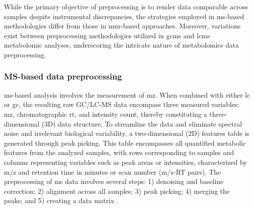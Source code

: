 \documentclass[ENG, BIB]{TFUOC}%
\begin{document}
While the primary objective of preprocessing is to render data comparable across samples despite instrumental discrepancies, the strategies employed in \gls{ms}-based methodologies differ from those in \gls{nmr}-based approaches. Moreover, variations exist between preprocessing methodologies utilized in \gls{gcms} and \gls{lcms} metabolomic analyses, underscoring the intricate nature of metabolomics data preprocessing.


\subsubsection{MS-based data preprocessing}

\gls{ms}-based analysis involves the measurement of \gls{mz}. When combined with either \gls{lc} or \gls{gc}, the resulting raw GC/LC-MS data encompass three measured variables: \gls{mz}, chromatographic \gls{rt}, and intensity count, thereby constituting a three-dimensional (3D) data structure.
To streamline the data and eliminate spectral noise and irrelevant biological variability, a two-dimensional (2D) features table is generated through peak picking. This table encompasses all quantified metabolic features from the analyzed samples, with rows corresponding to samples and columns representing variables such as peak areas or intensities, characterized by m/z and retention time in minutes or scan number (m/z-RT pairs).
The preprocessing of \gls{ms} data involves several steps: 1) denoising and baseline correction; 2) alignment across all samples; 3) peak picking; 4) merging the peaks; and 5) creating a data matrix \cite{chenGuideMetabolomicsAnalysis2022a,sunPretreatingNormalizingMetabolomics2024,xiaoMetaboliteIdentificationQuantitation2012, defernezChapterElevenStrategies2013,troisiChapterDataAnalysis2022,burtonInstrumentalExperimentalEffects2008,trygg01BackgroundEstimation2009,alonsoAnalyticalMethodsUntargeted2015,bloembergWarpingMethodsSpectroscopic2013}.
\end{document}
